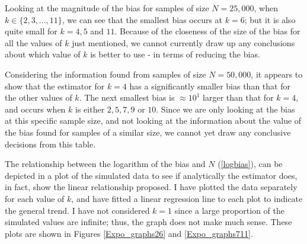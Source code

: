 \documentclass[12pt]{report}
\begin{document}
Looking at the magnitude of the bias for samples of size $N=25,000$, when $k \in \{2, 3, ..., 11\}$, we can see that the smallest bias occurs at $k=6$; but it is also quite small for $k=4, 5$ and $11$. Because of the closeness of the size of the bias for all the values of $k$ just mentioned, we cannot currently draw up any conclusions about which value of $k$ is better to use - in terms of reducing the bias.

Considering the information found from samples of size $N=50,000$, it appears to show that the estimator for $k=4$ has a significantly smaller bias than that for the other values of $k$. The next smallest bias is $\approx 10^1$ larger than that for $k=4$, and occurs when $k$ is either $2, 5, 7, 9$ or $10$. Since we are only looking at the bias at this specific sample size, and not looking at the information about the value of the bias found for samples of a similar size, we cannot yet draw any conclusive decisions from this table.

The relationship between the logarithm of the bias and $N$ (\ref{logbias}), can be depicted in a plot of the simulated data to see if analytically the estimator does, in fact, show the linear relationship proposed. I have plotted the data separately for each value of $k$, and have fitted a linear regression line to each plot to indicate the general trend. I have not considered $k=1$ since a large proportion of the simulated values are infinite; thus, the graph does not make much sense. These plots are shown in Figures \ref{Expo_graphs26} and \ref{Expo_graphs711}.
\end{document}

